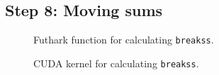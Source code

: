 \subsection{
    Step 8: Moving sums
}

\begin{figure}[H]
    \centering
    \caption{Futhark function for calculating \texttt{breakss}.}
    \label{fut:kernel8}
\end{figure}

\begin{figure}[H]
    \centering
    \caption{CUDA kernel for calculating  \texttt{breakss}.}
    \label{cuda:kernel8}
\end{figure}

